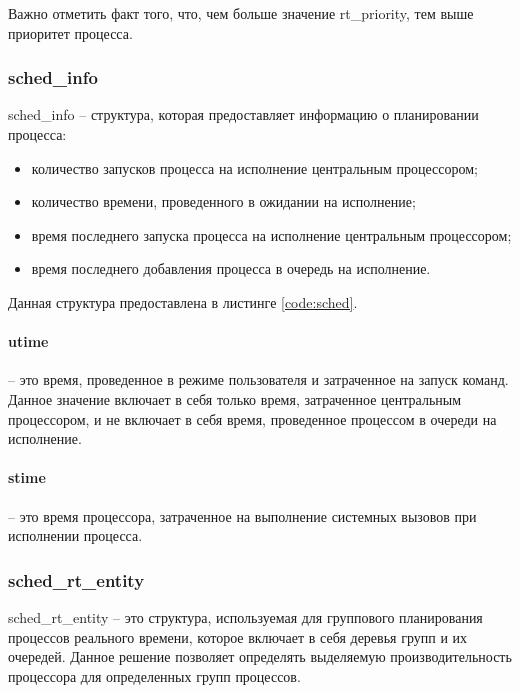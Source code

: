Важно отметить факт того, что, чем больше значение rt\_priority, тем выше приоритет процесса.

\subsubsection{sched\_info} 
sched\_info -- структура, которая предоставляет информацию о планировании процесса:
\begin{itemize}[leftmargin=1.6\parindent]
\item количество запусков процесса на исполнение центральным процессором;
\item количество времени, проведенного в ожидании на исполнение;
\item время последнего запуска процесса на исполнение центральным процессором;
\item время последнего добавления процесса в очередь на исполнение.
\end{itemize}

Данная структура предоставлена в листинге \ref{code:sched}.


\paragraph*{utime} -- это время, проведенное в режиме пользователя и затраченное на запуск команд. Данное значение включает в себя только время, затраченное центральным процессором, и не включает в себя время, проведенное процессом в очереди на исполнение.

\paragraph*{stime} -- это время процессора, затраченное на выполнение системных вызовов при исполнении процесса.

\subsubsection{sched\_rt\_entity} 
sched\_rt\_entity -- это структура, используемая для группового планирования процессов реального времени, которое включает в себя деревья групп и их очередей. Данное решение позволяет определять выделяемую производительность процессора для определенных групп процессов.

